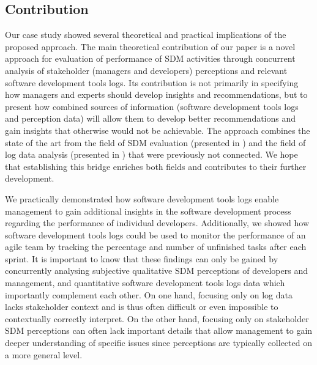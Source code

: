 \subsection{Contribution}

Our case study showed several theoretical and practical implications of the proposed approach. The main theoretical contribution of our paper is a novel approach for evaluation of performance of SDM activities through concurrent analysis of stakeholder (managers and developers) perceptions and relevant software development tools logs. Its contribution is not primarily in specifying how managers and experts should develop insights and recommendations, but to present how combined sources of information (software development tools logs and perception data) will allow them to develop better recommendations and gain insights that otherwise would not be achievable. The approach combines the state of the art from the field of SDM evaluation (presented in ) and the field of log data analysis (presented in ) that were previously not connected. We hope that establishing this bridge enriches both fields and contributes to their further development.

We practically demonstrated how software development tools logs enable management to gain additional insights in the software development process regarding the performance of individual developers. Additionally, we showed how software development tools logs could be used to monitor the performance of an agile team by tracking the percentage and number of unfinished tasks after each sprint. It is important to know that these findings can only be gained by concurrently analysing subjective qualitative SDM perceptions of developers and management, and quantitative software development tools logs data which importantly complement each other. On one hand, focusing only on log data lacks stakeholder context and is thus often difficult or even impossible to contextually correctly interpret. On the other hand, focusing only on stakeholder SDM perceptions can often lack important details that allow management to gain deeper understanding of specific issues since perceptions are typically collected on a more general level. 

